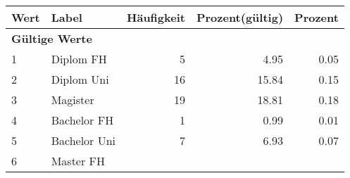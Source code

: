      \begin{longtable}{lXrrr}
     \toprule
     \textbf{Wert} & \textbf{Label} & \textbf{Häufigkeit} & \textbf{Prozent(gültig)} & \textbf{Prozent} \\
     \endhead
     \midrule
     \multicolumn{5}{l}{\textbf{Gültige Werte}}\\

     1 &
     \multicolumn{1}{X}{ Diplom FH   } &


       \num{5} &
       \num[round-mode=places,round-precision=2]{4,95} &
         \num[round-mode=places,round-precision=2]{0,05} \\

     2 &
     \multicolumn{1}{X}{ Diplom Uni   } &


       \num{16} &
       \num[round-mode=places,round-precision=2]{15,84} &
         \num[round-mode=places,round-precision=2]{0,15} \\

     3 &
     \multicolumn{1}{X}{ Magister   } &


       \num{19} &
       \num[round-mode=places,round-precision=2]{18,81} &
         \num[round-mode=places,round-precision=2]{0,18} \\

     4 &
     \multicolumn{1}{X}{ Bachelor FH   } &


       \num{1} &
       \num[round-mode=places,round-precision=2]{0,99} &
         \num[round-mode=places,round-precision=2]{0,01} \\

     5 &
     \multicolumn{1}{X}{ Bachelor Uni   } &


       \num{7} &
       \num[round-mode=places,round-precision=2]{6,93} &
         \num[round-mode=places,round-precision=2]{0,07} \\

     6 &
     \multicolumn{1}{X}{ Master FH   } &



\end{longtable}

